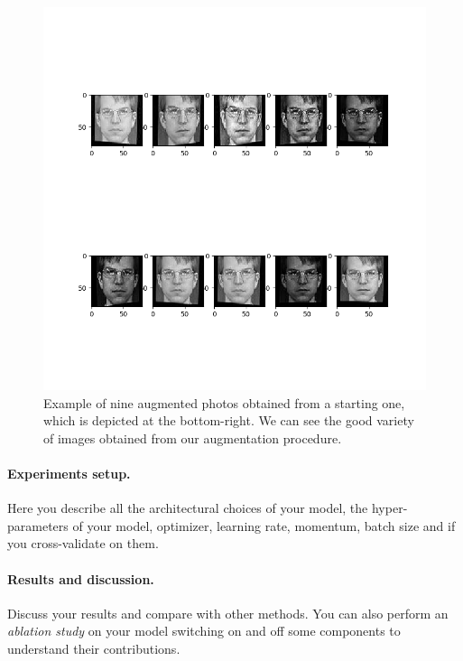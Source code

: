 \begin{figure}[t]
\includegraphics[width=0.8\linewidth]{images/augmented.png}
   \caption{Example of nine augmented photos obtained from a starting one, which is depicted at the bottom-right. We can see the good variety of images obtained from our augmentation procedure.}
\label{fig:long}
\label{fig:onecol}
\end{figure}


\paragraph{Experiments setup.}
Here you describe all the architectural choices of your model, the hyper-parameters of your model, \eg optimizer, learning rate, momentum, batch size and if you cross-validate on them. 

\paragraph{Results and discussion.}
Discuss your results and compare with other methods. You can also perform an \emph{ablation study} on your model switching on and off some components to understand their contributions.
